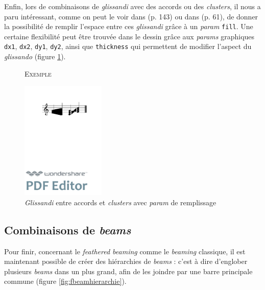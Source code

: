 \documentclass{article}
\newenvironment{gmncode}	{\vspace{-2mm}\small\verbatim}{\endverbatim\vspace{-2mm}}
\newcommand{\code}[1]		{{\small \texttt{#1}}}
\newcommand{\exemple}		{\vspace{2mm}\hspace*{-3mm}\textsc{Exemple}}
\begin{document}
Enfin, lors de combinaisons de \emph{glissandi}  avec des accords ou des \emph{clusters}, il nous a paru intéressant, comme on peut le voir dans \cite{gould2011behind} (p. 143) ou dans \cite{stone1980music} (p. 61), de donner la possibilité de remplir l'espace entre ces \emph{glissandi} grâce à un \emph{param} \code{fill}. Une certaine flexibilité peut être trouvée dans le dessin grâce aux \emph{params} graphiques \code{dx1}, \code{dx2}, \code{dy1}, \code{dy2}, ainsi que \code{thickness} qui permettent de modifier l'aspect du \emph{glissando} (figure \ref{fig:glissandofill}).

\begin{figure}[h]

\exemple
\begin{center}
\begin{gmncode}
[ 
  \glissando<fill="true", dx1=-2, dx2=2, 
      thickness=2.2> (
    \cluster({e,g} {c,b})
  )
  \glissando<fill="true">(
    {c,e,g} {a,c2,f1}
  )
]
\end{gmncode}

\includegraphics[width=4cm]{img/glissandofill.pdf}
\caption{\emph{Glissandi} entre accords et \emph{clusters} avec \emph{param} de remplissage}
\label{fig:glissandofill}
\end{center}
\end{figure}


\subsection{Combinaisons de \emph{beams}}\label{subsec:combinaisonBeams}

Pour finir, concernant le \emph{feathered beaming} comme le \emph{beaming} classique, il est maintenant possible de créer des hiérarchies de \emph{beams} : c'est à dire d'englober plusieurs \emph{beams} dans un plus grand, afin de les joindre par une barre principale commune (figure \ref{fig:fbeamhierarchie}).
\end{document}
